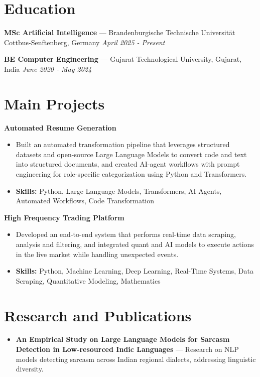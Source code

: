 \documentclass[a4paper,10pt]{article}
\begin{document}
\section*{Education}
\textbf{MSc Artificial Intelligence} — Brandenburgische Technische Universität Cottbus-Senftenberg, Germany \hfill \textit{April 2025 - Present}\par
\vspace{1.5pt}
\textbf{BE Computer Engineering} — Gujarat Technological University, Gujarat, India \hfill \textit{June 2020 - May 2024}\par

\section*{Main Projects}
\textbf{Automated Resume Generation}\par
\vspace{1pt}
\begin{itemize}
  \item Built an automated transformation pipeline that leverages structured datasets and open-source Large Language Models to convert code and text into structured documents, and created AI-agent workflows with prompt engineering for role-specific categorization using Python and Transformers.
  \item \textbf{Skills:} Python, Large Language Models, Transformers, AI Agents, Automated Workflows, Code Transformation
\end{itemize}
\vspace{3pt}
\textbf{High Frequency Trading Platform}\par
\vspace{1pt}
\begin{itemize}
  \item Developed an end-to-end system that performs real-time data scraping, analysis and filtering, and integrated quant and AI models to execute actions in the live market while handling unexpected events.
  \item \textbf{Skills:} Python, Machine Learning, Deep Learning, Real-Time Systems, Data Scraping, Quantitative Modeling, Mathematics
\end{itemize}

\section*{Research and Publications}
\begin{itemize}
\item \textbf{An Empirical Study on Large Language Models for Sarcasm Detection in Low-resourced Indic Languages} — Research on NLP models detecting sarcasm across Indian regional dialects, addressing linguistic diversity.
\end{itemize}
\end{document}
